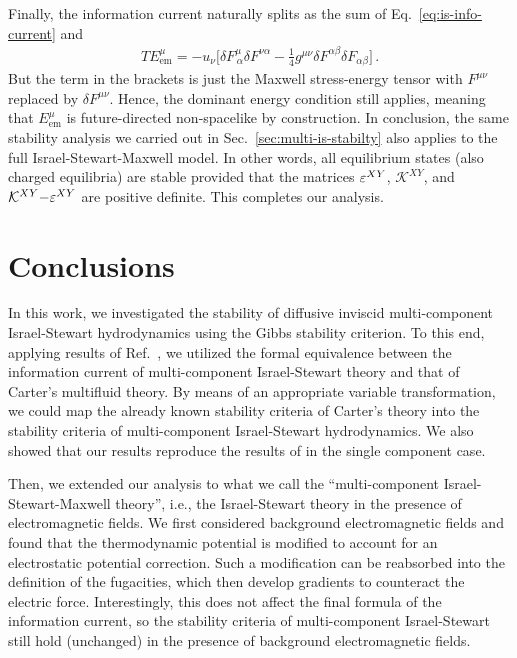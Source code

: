 \documentclass[
a4paper,
amsfonts,
amsmath,
reprint,
showkeys,
nofootinbib,
twoside,
onecolumn,
notitlepage
]{revtex4-1}
\begin{document}
	Finally, the information current naturally splits as the sum of Eq.\ \eqref{eq:is-info-current} and
	\begin{eqnarray}\label{eq:carbonara-with-onions}
		TE_{\text{em}}^\mu = -u_\nu \bigg[  \delta F^{\mu}_{\,\alpha}  \delta F^{\nu\alpha}-\frac{1}{4} g^{\mu \nu} \delta F^{\alpha \beta}  \delta F_{\alpha \beta}  \bigg] \, .
	\end{eqnarray}
	But the term in the brackets is just the Maxwell stress-energy tensor with $F^{\mu \nu}$ replaced by $\delta F^{\mu \nu}$. 
Hence, the dominant energy condition still applies, meaning that $E_{\text{em}}^\mu$ is future-directed non-spacelike by construction. 
In conclusion, the same stability analysis we carried out in Sec.\ \ref{sec:multi-is-stabilty} also applies to the full Israel-Stewart-Maxwell model. 
	In other words, all equilibrium states (also charged equilibria) are stable provided that the matrices $\varepsilon^{XY}$, $\mathcal{K}^{XY}$, and $\mathcal{K}^{XY}{-}\varepsilon^{XY}$ are positive definite. 
	This completes our analysis.
	
	
	\section{Conclusions}
	\label{sec:connclusion}
	In this work, we investigated the stability of diffusive inviscid multi-component Israel-Stewart hydrodynamics using the Gibbs stability criterion. 
	To this end, applying results of Ref.\ \cite{GavassinoUniversality2023}, we utilized the formal equivalence between the information current of multi-component Israel-Stewart theory and that of Carter's multifluid theory. 
    By means of an appropriate variable transformation, we could map the already known stability criteria of Carter's theory \cite{GavassinoStabilityCarter2022} into the stability criteria of multi-component Israel-Stewart hydrodynamics. 
	We also showed that our results reproduce the results of \citet{OlsonLifsh1990} in the single component case.
	
	Then, we extended our analysis to what we call the ``multi-component Israel-Stewart-Maxwell theory'', i.e., the Israel-Stewart theory in the presence of electromagnetic fields. 
	We first considered background electromagnetic fields and found that the thermodynamic potential is modified to account for an electrostatic potential correction. 
	Such a modification can be reabsorbed into the definition of the fugacities, which then develop gradients to counteract the electric force. 
    Interestingly, this does not affect the final formula of the information current, so the stability criteria of multi-component Israel-Stewart still hold (unchanged) in the presence of background electromagnetic fields. 
	
\end{document}
